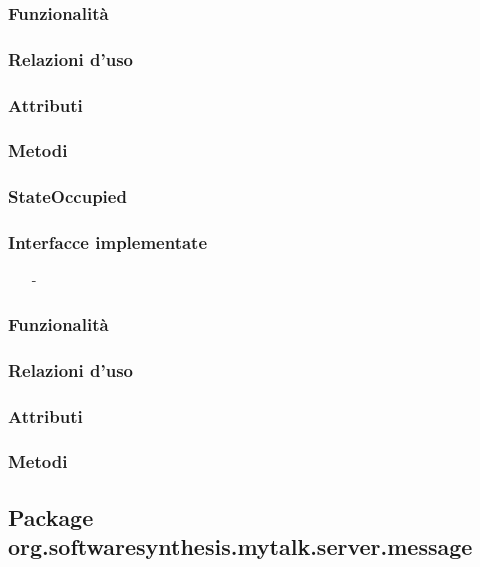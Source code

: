 \subsubsection*{Funzionalità}

\subsubsection*{Relazioni d'uso}

\subsubsection*{Attributi}

\subsubsection*{Metodi}

\subsubsection{StateOccupied}\label{sec:stateoccupied}

\subsubsection*{Interfacce implementate}
\begin{itemize}[noitemsep,nolistsep]
  \item[-]
\end{itemize}

\subsubsection*{Funzionalità}

\subsubsection*{Relazioni d'uso}

\subsubsection*{Attributi}

\subsubsection*{Metodi}

\subsection{Package org.softwaresynthesis.mytalk.server.message}\label{sec:message}

